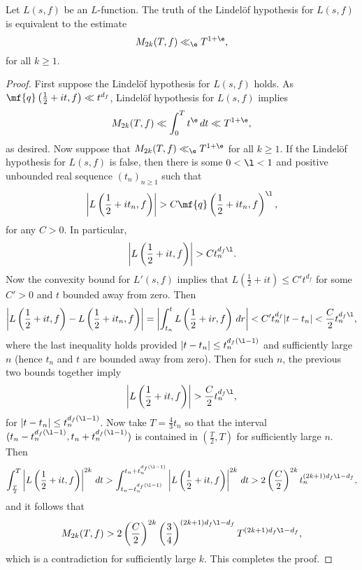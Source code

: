   \begin{proposition}\label{prop:equivalence_Lindelof_hypothesis_and_moments}
    Let $L(s,f)$ be an $L$-function. The truth of the Lindel\"of hypothesis for $L(s,f)$ is equivalent to the estimate
    \[
      M_{2k}(T,f) \ll_{\e} T^{1+\e},
    \]
    for all $k \ge 1$.
  \end{proposition}
  \begin{proof}
    First suppose the Lindel\"of hypothesis for $L(s,f)$ holds. As $\mf{q}\left(\frac{1}{2}+it,f\right) \ll t^{d_{f}}$, Lindel\"of hypothesis for $L(s,f)$ implies
    \[
      M_{2k}(T,f) \ll \int_{0}^{T}t^{\e}\,dt \ll T^{1+\e},
    \]
    as desired. Now suppose that $M_{2k}(T,f) \ll_{\e} T^{1+\e}$ for all $k \ge 1$. If the Lindel\"of hypothesis for $L(s,f)$ is false, then there is some $0 < \l < 1$ and positive unbounded real sequence $(t_{n})_{n \ge 1}$ such that
    \[
      \left|L\left(\frac{1}{2}+it_{n},f\right)\right| > C\mf{q}\left(\frac{1}{2}+it_{n},f\right)^{\l},
    \]
    for any $C > 0$. In particular,
      \[
      \left|L\left(\frac{1}{2}+it,f\right)\right| > Ct_{n}^{d_{f}\l}.
    \]
    Now the convexity bound for $L'(s,f)$ implies that $L\left(\frac{1}{2}+it\right) \le C't^{d_{f}}$ for some $C' > 0$ and $t$ bounded away from zero. Then
    \[
      \left|L\left(\frac{1}{2}+it,f\right)-L\left(\frac{1}{2}+it_{n},f\right)\right| = \left|\int_{t_{n}}^{t}L\left(\frac{1}{2}+ir,f\right)\,dr\right| < C't_{n}^{d_{f}}|t-t_{n}| < \frac{C}{2}t_{n}^{d_{f}\l},
    \]
    where the last inequality holds provided $|t-t_{n}| \le t_{n}^{d_{f}(\l-1)}$ and sufficiently large $n$ (hence $t_{n}$ and $t$ are bounded away from zero). Then for such $n$, the previous two bounds together imply
    \[
      \left|L\left(\frac{1}{2}+it,f\right)\right| > \frac{C}{2}t_{n}^{d_{f}\l},
    \]
    for $|t-t_{n}| \le t_{n}^{d_{f}(\l-1)}$. Now take $T = \frac{4}{3}t_{n}$ so that the interval $(t_{n}-t_{n}^{d_{f}(\l-1)},t_{n}+t_{n}^{d_{f}(\l-1)})$ is contained in $\left(\frac{T}{2},T\right)$ for sufficiently large $n$. Then
    \[
      \int_{\frac{T}{2}}^{T}\left|L\left(\frac{1}{2}+it,f\right)\right|^{2k}\,dt > \int_{t_{n}-t_{n}^{d_{f}(\l-1)}}^{t_{n}+t_{n}^{d_{f}(\l-1)}}\left|L\left(\frac{1}{2}+it,f\right)\right|^{2k}\,dt > 2\left(\frac{C}{2}\right)^{2k}t_{n}^{(2k+1)d_{f}\l-d_{f}},
    \]
    and it follows that
    \[
      M_{2k}(T,f) > 2\left(\frac{C}{2}\right)^{2k}\left(\frac{3}{4}\right)^{(2k+1)d_{f}\l-d_{f}}T^{(2k+1)d_{f}\l-d_{f}},
    \]
    which is a contradiction for sufficiently large $k$. This completes the proof.
  \end{proof}

